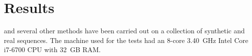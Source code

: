 \clearpage
\section{Results}
\label{sec.results}
\smashpp and several other methods have been carried out on a collection of synthetic and real sequences. The machine used for the tests had an 8-core 3.40~GHz Intel\textsuperscript{\textregistered} Core\texttrademark\xspace i7-6700 CPU with 32~GB RAM.